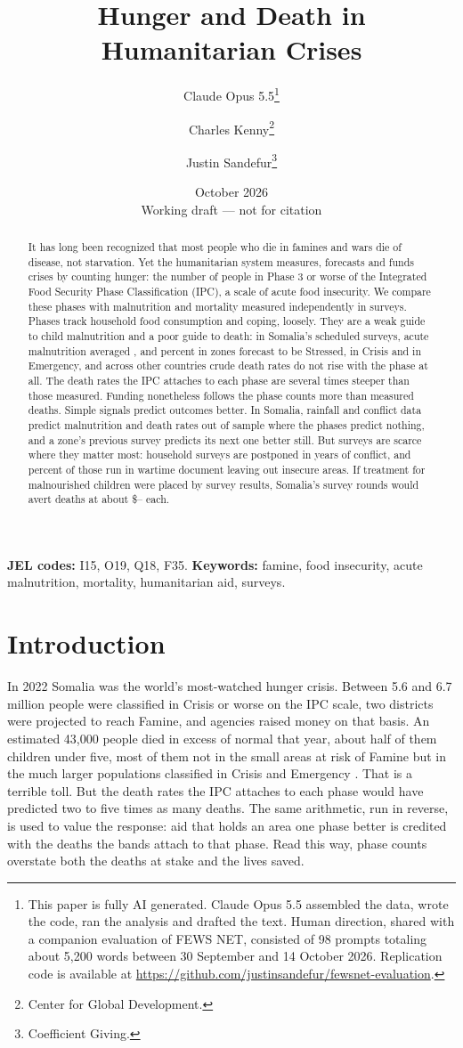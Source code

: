\documentclass[11pt]{article}
\title{Hunger and Death in Humanitarian Crises}
\author{Claude Opus 5.5\thanks{This paper is fully AI generated. Claude Opus 5.5 assembled the data, wrote the code, ran the analysis and drafted the text. Human direction, shared with a companion evaluation of FEWS NET, consisted of 98 prompts totaling about 5,200 words between 30 September and 14 October 2026. Replication code is available at \url{https://github.com/justinsandefur/fewsnet-evaluation}.} \and Charles Kenny\thanks{Center for Global Development.} \and Justin Sandefur\thanks{Coefficient Giving.}}
\date{October 2026 \\ \small Working draft --- not for citation}
\begin{document}
\maketitle

\begin{abstract}
\noindent It has long been recognized that most people who die in famines and wars die of disease, not starvation. Yet the humanitarian system measures, forecasts and funds crises by counting hunger: the number of people in Phase 3 or worse of the Integrated Food Security Phase Classification (IPC), a scale of acute food insecurity. We compare these phases with malnutrition and mortality measured independently in surveys. Phases track household food consumption and coping, loosely. They are a weak guide to child malnutrition and a poor guide to death: in Somalia's scheduled surveys, acute malnutrition averaged \fsGamTwo{}, \fsGamThree{} and \fsGamFour{} percent in zones forecast to be Stressed, in Crisis and in Emergency, and across other countries crude death rates do not rise with the phase at all. The death rates the IPC attaches to each phase are several times steeper than those measured. Funding nonetheless follows the phase counts more than measured deaths. Simple signals predict outcomes better. In Somalia, rainfall and conflict data predict malnutrition and death rates out of sample where the phases predict nothing, and a zone's previous survey predicts its next one better still. But surveys are scarce where they matter most: household surveys are postponed in years of conflict, and \exWar{} percent of those run in wartime document leaving out insecure areas. If treatment for malnourished children were placed by survey results, Somalia's survey rounds would avert deaths at about \$\voiRangeLo{}--\voiRangeHi{} each.
\end{abstract}

\vspace{1em}
\noindent\textbf{JEL codes:} I15, O19, Q18, F35. \quad \textbf{Keywords:} famine, food insecurity, acute malnutrition, mortality, humanitarian aid, surveys.

\newpage
\section{Introduction}

In 2022 Somalia was the world's most-watched hunger crisis. Between 5.6 and 6.7 million people were classified in Crisis or worse on the IPC scale, two districts were projected to reach Famine, and agencies raised money on that basis. An estimated 43,000 people died in excess of normal that year, about half of them children under five, most of them not in the small areas at risk of Famine but in the much larger populations classified in Crisis and Emergency \citep{lshtm2023somalia}. That is a terrible toll. But the death rates the IPC attaches to each phase would have predicted two to five times as many deaths. The same arithmetic, run in reverse, is used to value the response: aid that holds an area one phase better is credited with the deaths the bands attach to that phase. Read this way, phase counts overstate both the deaths at stake and the lives saved.
\end{document}
